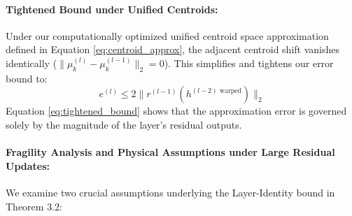 \paragraph{Tightened Bound under Unified Centroids:} Under our computationally optimized unified centroid space approximation defined in Equation \eqref{eq:centroid_approx}, the adjacent centroid shift vanishes identically ($\|\mu_k^{(l)} - \mu_k^{(l-1)}\|_2 = 0$). This simplifies and tightens our error bound to:
\begin{equation}
e^{(l)} \le 2 \| r^{(l-1)}(h^{(l-2) \text{ warped}}) \|_2
\label{eq:tightened_bound}
\end{equation}
Equation \eqref{eq:tightened_bound} shows that the approximation error is governed solely by the magnitude of the layer's residual outputs.

\paragraph{Fragility Analysis and Physical Assumptions under Large Residual Updates:} 
We examine two crucial assumptions underlying the Layer-Identity bound in Theorem 3.2:
